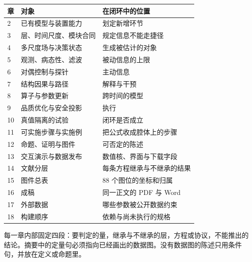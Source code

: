 \begin{center}
\begin{tabularx}{\textwidth}{llX}
\toprule
章 & 对象 & 在闭环中的位置 \\
\midrule
2 & 已有模型与装置能力 & 划定新增环节 \\
3 & 层、时间尺度、模块合同 & 规定信息不能走捷径 \\
4 & 多尺度场与决策状态 & 生成被估计的对象 \\
5 & 观测、病态性、滤波 & 被动信息的上限 \\
6 & 对偶控制与探针 & 主动信息 \\
7 & 结构因果与路径 & 解释与干预 \\
8 & 算子与参数更新 & 跨时间的模型 \\
9 & 品质优化与安全投影 & 执行 \\
10 & 真值隔离的试验 & 闭环是否成立 \\
11 & 可实施步骤与实施例 & 把公式收成腔体上的步骤 \\
12 & 命题、证明与图件 & 可否定的陈述 \\
13 & 交互演示与数据发布 & 数值核、界面与下载字段 \\
14 & 文献分层 & 每条方程继承与不继承的结果 \\
15 & 图件总表 & 88 个图位的坐标和归属 \\
16 & 成稿 & 同一正文的 PDF 与 Word \\
17 & 外部数据 & 哪些参数被公开数据约束 \\
18 & 构建顺序 & 依赖与尚未执行的规格 \\
\bottomrule
\end{tabularx}
\end{center}

每一章内部固定四段：要判定的量，继承与不继承的层，方程或协议，不能推出的结论。摘要中的定量句必须指向已经画出的数据图。没有数据图的陈述只用条件句，并放在定义或命题里。
